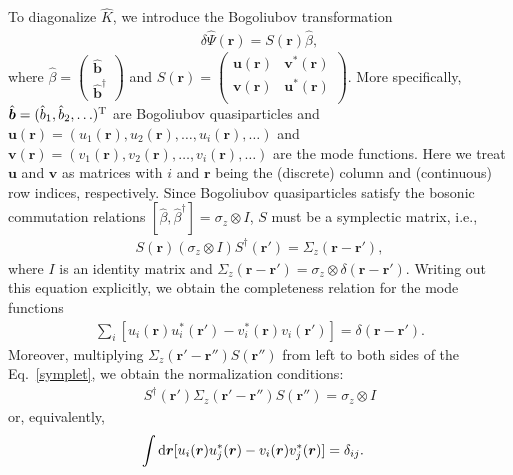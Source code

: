 \documentclass[pra,twocolumn,preprintnumbers,superscriptaddress,longbibliography,showkeys]{revtex4-1}
\begin{document}
To diagonalize $\hat K$, we introduce the Bogoliubov transformation
\begin{align}
	\delta\hat{\Psi}({\bm r})=S({\bm r})\hat{\beta},\label{bogtran}
\end{align}
where $\hat\beta=\begin{pmatrix}\hat {\boldsymbol b}\\\hat {\boldsymbol b}^\dag\end{pmatrix}$ and $S({\bm r}) = \begin{pmatrix}{\boldsymbol u}({\bm r}) & {\boldsymbol v}^{\ast}({\bm r}) \\{\boldsymbol v}({\bm r}) & {\boldsymbol u}^{\ast}({\bm r}) \\\end{pmatrix}$. More specifically, $\hat{\boldsymbol b}=(\hat b_1,\hat b_2,\ldots)^{\rm T}$ are Bogoliubov quasiparticles and ${\boldsymbol u}({\bm r})=(u_1({\bm r}),u_2({\bm r}),\ldots,u_i({\bm r}),\ldots)$ and ${\boldsymbol v}({\bm r})=(v_1({\bm r}),v_2({\bm r}),\ldots,v_i({\bm r}),\ldots)$ are the mode functions. Here we treat ${\boldsymbol u}$ and ${\boldsymbol v}$ as matrices with $i$ and ${\bm r}$ being the (discrete) column and (continuous) row indices, respectively. Since Bogoliubov quasiparticles satisfy the bosonic commutation relations $[\hat\beta,\hat{\beta}^\dag]=\sigma_z\otimes I$, $S$ must be a symplectic matrix, i.e.,
\begin{align}
S({\bm r})(\sigma_z\otimes I) S^\dagger({\bm r}')=\Sigma_z({\bm r}-{\bm r}'),\label{symplet}
\end{align}
where $I$ is an identity matrix and $\Sigma_z({\bm r}-{\bm r}')=\sigma_z\otimes\delta({\bm r}-{\bm r}')$. Writing out this equation explicitly, we obtain the completeness relation for the mode functions
\begin{align}
\sum_i[u_i({\bm r})u_i^*({\bm r}')-v_i^*({\bm r})v_i({\bm r}')]=\delta({\bm r}-{\bm r}').
\end{align}
Moreover, multiplying $\Sigma_z({\bm r}'-{\bm r}'')S({\bm r}'')$ from left to both sides of the Eq.~\eqref{symplet}, we obtain the normalization conditions:
\begin{align}
S^\dagger({\bm r}')\Sigma_z({\bm r}'-{\bm r}'')S({\bm r}'')=\sigma_z\otimes I
\end{align}
or, equivalently,
\begin{align}
\int {\rm d}{\bm r}[u_i({\bm r})u_j^*({\bm r})-v_i({\bm r})v_j^*({\bm r})]&=\delta_{ij}.
\end{align}
\end{document}
